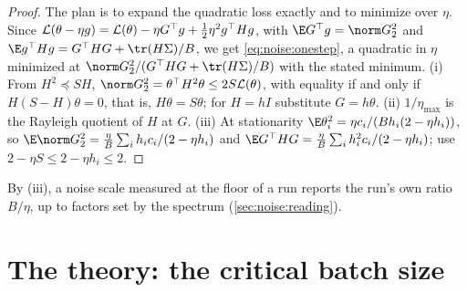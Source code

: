 \begin{refsection}
\begin{proof}
The plan is to expand the quadratic loss exactly and to minimize over $\eta$. Since $\mathcal{L}(\theta-\eta g)=\mathcal{L}(\theta)-\eta G^\top g+\frac12\eta^2g^\top Hg$, with $\E G^\top g=\norm G_2^2$ and $\E g^\top Hg=G^\top HG+\tr(H\Sigma)/B$, we get \eqref{eq:noise:onestep}, a quadratic in $\eta$ minimized at $\norm G_2^2/(G^\top HG+\tr(H\Sigma)/B)$ with the stated minimum. (i) From $H^2\preceq SH$, $\norm G_2^2=\theta^\top H^2\theta\le2S\Loss(\theta)$, with equality if and only if $H(S-H)\theta=0$, that is, $H\theta=S\theta$; for $H=hI$ substitute $G=h\theta$. (ii) $1/\eta_{\max}$ is the Rayleigh quotient of $H$ at $G$. (iii) At stationarity $\E\theta_i^2=\eta c_i/(Bh_i(2-\eta h_i))$, so $\E\norm G_2^2=\frac\eta B\sum_ih_ic_i/(2-\eta h_i)$ and $\E G^\top HG=\frac\eta B\sum_ih_i^2c_i/(2-\eta h_i)$; use $2-\eta S\le2-\eta h_i\le2$.
\end{proof}

By (iii), a noise scale measured at the floor of a run reports the run's own ratio $B/\eta$, up to factors set by the spectrum (\cref{sec:noise:reading}).

\section{The theory: the critical batch size}\label{sec:noise:critical}



\end{refsection}
